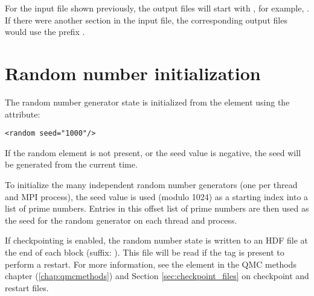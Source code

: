 For the input file shown previously, the output files will start with , for example, .
If there were another  section in the input file, the corresponding output files would use the prefix .



\section{Random number initialization}

The random number generator state is initialized from the  element using the  attribute:
\begin{lstlisting}[style=QMCPXML]
<random seed="1000"/>
\end{lstlisting}

If the random element is not present, or the seed value is negative, the seed will be generated from the current time.

To initialize the many independent random number generators (one per thread and MPI process), the seed value is used (modulo 1024) as a starting index into a list of prime numbers.
Entries in this offset list of prime numbers are then used as the seed for the random generator on each thread and process.

If checkpointing is enabled, the random number state is written to an HDF file at the end of each block (suffix: ).
This file will be read if the  tag is present to perform a restart.
For more information, see the  element in the QMC methods chapter (\ref{chap:qmcmethods}) and Section \ref{sec:checkpoint_files} on checkpoint and restart files.
